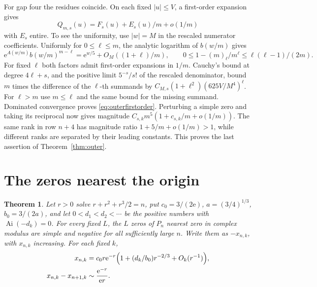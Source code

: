 \documentclass[11pt]{article}
\newtheorem{theorem}{Theorem}
\DeclareMathOperator{\Ai}{Ai}
\newcommand{\ee}{\mathrm e}
\begin{document}
For gap four the residues coincide. On each fixed \(|u|\le V\), a first-order expansion gives
\begin{equation}
 Q_{m,s}(u)=F_s(u)+E_s(u)/m+o(1/m)
 \label{eq:outerfirstorder}
\end{equation}
with \(E_s\) entire. To see the uniformity, use \(|w|=M\) in the rescaled numerator coefficients. Uniformly for \(0\le\ell\le m\), the analytic logarithm of \(b(w/m)\) gives
\[
 \ee^{A(w/m)}b(w/m)^{m-\ell}=\ee^{w/5}+O_M((1+\ell)/m),
 \qquad
 0\le1-(m)_\ell/m^\ell\le\ell(\ell-1)/(2m).
\]
For fixed \(\ell\) both factors admit first-order expansions in \(1/m\). Cauchy's bound at degree \(4\ell+s\), and the positive limit \(5^{-s}/s!\) of the rescaled denominator, bound \(m\) times the difference of the \(\ell\)-th summands by \(C_{M,s}(1+\ell^2)(625V/M^4)^\ell\). For \(\ell>m\) use \(m\le\ell\) and the same bound for the missing summand. Dominated convergence proves \eqref{eq:outerfirstorder}. Perturbing a simple zero and taking its reciprocal now gives magnitude \(C_{s,k}m^5(1+c_{s,k}/m+o(1/m))\). The same rank in row \(n+4\) has magnitude ratio \(1+5/m+o(1/m)>1\), while different ranks are separated by their leading constants. This proves the last assertion of Theorem~\ref{thm:outer}.

\section{The zeros nearest the origin}\label{sec:airy}

\begin{theorem}\label{thm:airy}
Let \(r>0\) solve \(r+r^2+r^3/2=n\), put \(c_0=3/(2\ee)\), \(a=(3/4)^{1/3}\), \(b_0=3/(2a)\), and let \(0<d_1<d_2<\cdots\) be the positive numbers with \(\Ai(-d_k)=0\). For every fixed \(L\), the \(L\) zeros of \(P_n\) nearest zero in complex modulus are simple and negative for all sufficiently large \(n\). Write them as \(-x_{n,k}\), with \(x_{n,k}\) increasing. For each fixed \(k\),
\[
 \begin{split}
 x_{n,k}&=c_0 r\ee^{-r}\Bigl(1+(d_k/b_0)r^{-2/3}+O_k(r^{-1})\Bigr),\\
 x_{n,k}-x_{n+1,k}&\sim\frac{\ee^{-r}}{\ee r}.
 \end{split}
\]
\end{theorem}
\end{document}

